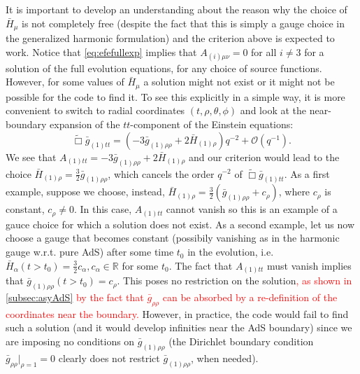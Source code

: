 \documentclass[a4paper,11pt]{article}
\begin{document}
It is important to develop an understanding about the reason why the choice of $\bar{H}_\mu$ is not completely free (despite the fact that this is simply a gauge choice in the generalized harmonic formulation) and the criterion above is expected to work. 
Notice that \eqref{eq:efefullexp} implies that $A_{(i)\mu\nu}=0$ for all $i\neq3$ for a solution of the full evolution equations, for any choice of source functions.
%
However, for some values of $\bar{H}_\mu$ a solution might not exist or it might not be possible for the code to find it. To see this explicitly in a simple way, it is more convenient to switch to radial coordinates $(t,\rho,\theta,\phi)$ and look at the near-boundary expansion of the $tt$-component of the Einstein equations:
\begin{equation}\label{eqn:efettsph}
\tilde{\Box}\bar{g}_{(1)tt}=(-3 \bar{g}_{(1)\rho\rho}+2\bar{H}_{(1)\rho})q^{-2}+\mathcal{O}(q^{-1}).
\end{equation}
We see that $A_{(1)tt}=-3 \bar{g}_{(1)\rho\rho}+2\bar{H}_{(1)\rho}$ and our criterion would lead to the choice $\bar{H}_{(1)\rho}=\frac{3}{2} \bar{g}_{(1)\rho\rho}$, which cancels the order $q^{-2}$ of $\tilde{\Box}\bar{g}_{(1)tt}$.
As a first example, suppose we choose, instead, $\bar{H}_{(1)\rho}=\frac{3}{2}( \bar{g}_{(1)\rho\rho}+c_\rho)$, where $c_\rho$ is constant, $c_\rho\ne0$. In this case, $A_{(1)tt}$ cannot vanish so this is an example of a gauce choice for which a solution does not exist.
As a second example, let us now choose a gauge that becomes constant (possibily vanishing as in the harmonic gauge w.r.t. pure AdS) after some time $t_0$ in the evolution, i.e. $\bar{H}_{\alpha}(t>t_0)=\frac{3}{2}c_{\alpha},c_{\alpha}\in \mathbb{R}$ for some $t_0$. The fact that $A_{(1)tt}$ must vanish implies that $\bar{g}_{(1)\rho\rho}(t>t_0)=c_\rho$. This poses no restriction on the solution\textcolor{red}{, as shown in \ref{subsec:asyAdS} by the fact that $\bar{g}_{\rho\rho}$ can be absorbed by a re-definition of the coordinates near the boundary.} However, in practice, the code would fail to find such a solution (and it would develop infinities near the AdS boundary) since we are imposing no conditions on  $\bar{g}_{(1)\rho\rho}$ (the Dirichlet boundary condition $\bar{g}_{\rho\rho}|_{\rho=1}=0$ clearly does not restrict $\bar{g}_{(1)\rho\rho}$, when needed).
\end{document}
